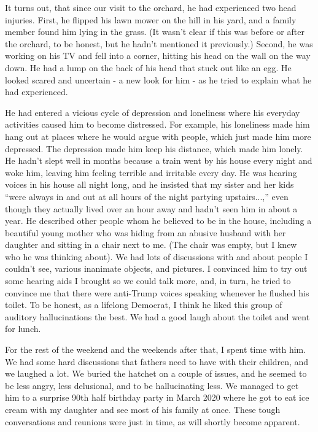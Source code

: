 \documentclass{article}
\begin{document}
It turns out, that since our visit to the orchard, he had experienced two head injuries. First, he flipped his lawn mower on the hill in his yard, and a family member found him lying in the grass. (It wasn't clear if this was before or after the orchard, to be honest, but he hadn't mentioned it previously.) Second, he was working on his TV and fell into a corner, hitting his head on the wall on the way down. He had a lump on the back of his head that stuck out like an egg. He looked scared and uncertain - a new look for him - as he tried to explain what he had experienced. 

He had entered a vicious cycle of depression and loneliness where his everyday activities caused him to become distressed. For example, his loneliness made him hang out at places where he would argue with people, which just made him more depressed. The depression made him keep his distance, which made him lonely. He hadn't slept well in months because a train went by his house every night and woke him, leaving him feeling terrible and irritable every day. He was hearing voices in his house all night long, and he insisted that my sister and her kids ``were always in and out at all hours of the night partying upstairs...,'' even though they actually lived over an hour away and hadn't seen him in about a year. He described other people whom he believed to be in the house, including a beautiful young mother who was hiding from an abusive husband with her daughter and sitting in a chair next to me. (The chair was empty, but I knew who he was thinking about).  We had lots of discussions with and about people I couldn't see, various inanimate objects, and pictures. I convinced him to try out some hearing aids I brought so we could talk more, and, in turn, he tried to convince me that there were anti-Trump voices speaking whenever he flushed his toilet. To be honest, as a lifelong Democrat, I think he liked this group of auditory hallucinations the best. We had a good laugh about the toilet and went for lunch.

For the rest of the weekend and the weekends after that, I spent time with him. We had some hard discussions that fathers need to have with their children, and we laughed a lot. We buried the hatchet on a couple of issues, and he seemed to be less angry, less delusional, and to be hallucinating less. We managed to get him to a surprise 90th half birthday party in March 2020 where he got to eat ice cream with my daughter and see most of his family at once. These tough conversations and reunions were just in time, as will shortly become apparent.
\end{document}
